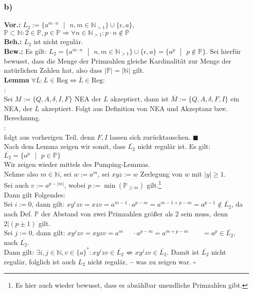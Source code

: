 \documentclass[12pt, a4paper]{article}
\newcommand*{\qed}{\null\nobreak\hfill\ensuremath{\square}}
\newcommand*{\lqed}{\null\nobreak\hfill\ensuremath{\blacksquare}}
\newcommand*{\gedanke}{\textbf{-- }}
\newcommand*{\gap}{\text{ }}
\newcommand*{\setDef}{\gap|\gap}
\newcommand*{\vor}{\textbf{Vor.:} \gap}
\newcommand*{\beh}{\textbf{Beh.:} \gap}
\newcommand*{\bew}{\textbf{Bew.:} \gap}
\begin{document}
\subsubsection*{b)}
\vor \(L_2 := \{a^{m \cdot n} \setDef n,m \in \mathbb N_{> 1}\} \cup \{\epsilon, a\}\),\gap\gap \(\mathbb P \subset \mathbb N: 2 \in \mathbb P, p \in \mathbb P \Rightarrow \forall n \in \mathbb N_{> 1}: p\cdot n \not\in \mathbb P\) \\
\beh \(L_2\) ist nicht regulär. \\
\bew Es gilt: \(L_2 = \{a^{m \cdot n} \setDef n,m \in \mathbb N_{> 1}\} \cup \{\epsilon, a\} = \{a^p \setDef p \not\in \mathbb P\}\). Sei hierfür bewusst, dass die Menge der Primzahlen gleiche Kardinalität zur Menge der natürlichen Zahlen hat, also dass \(|\mathbb P| = |\mathbb N|\) gilt. \\
\textbf{Lemma} \(\forall L: L \in \text{Reg} \Leftrightarrow \overline{L} \in \text{Reg}\): \\
\textquote{\(\Rightarrow\)}:\\
Sei \(M := \{Q, A, \delta, I, F\}\) NEA der \(L\) akzeptiert, dann ist \(\overline{M} := \{Q, A, \delta, F, I\}\) ein NEA, der \(\overline{L}\) akzeptiert. Folgt aus Definition von NEA und Akzeptanz bzw. Berechnung.\\
\textquote{\(\Leftarrow\)}:\\
folgt aus vorherigen Teil, denn \(F,I\) lassen sich zurücktauschen. \lqed\\
Nach dem Lemma zeigen wir somit, dass \(\overline{L_2}\) nicht regulär ist. Es gilt: \(\overline{L_2} = \{a^p \setDef p \in \mathbb P\}\)\\
Wir zeigen wieder mittels des Pumping-Lemmas.\\
Nehme also \(m \in \mathbb N\), sei \(w := a^m\), sei \(xyz := w\) Zerlegung von \(w\) mit \(|y| \ge 1\). \\
Sei auch \(v := a^{p - |m|}\), wobei \(p := \min(\mathbb P_{\ge m})\) gilt.\footnote[2]{Es  hier auch wieder bewusst, dass es abzählbar unendliche Primzahlen gibt.}\\
Dann gilt Folgendes: \\
Sei \(i := 0\), dann gilt: \(xy^izv = xzv = a^{m-1} \cdot a^{p-m} = a^{m-1+p-m} = a^{p-1} \not\in \overline{L_2}\), da nach Def. \(\mathbb P\) der Abstand von zwei Primzahlen größer als 2 sein muss, denn \(2 | (p\pm 1)\) gilt.\\
Sei \(j := 0\), dann gilt: \(xy^jzv = xyzv = a^m \gap\gap \cdot a^{p-m} = a^{m+p-m} \gap\gap\gap = a^{p} \in \overline{L_2}\), nach \(\overline{L_2}\).\\
Dann gilt: \(\exists i,j \in \mathbb{N}, v \in \{a\}^*: xy^izv \in \overline{L_2} \not\Leftrightarrow xy^jzv \in \overline{L_2}\). Damit ist \(\overline{L_2}\) nicht regulär, folglich ist auch \(L_2\) nicht regulär, \gedanke was zu zeigen war. \qed
\end{document}
